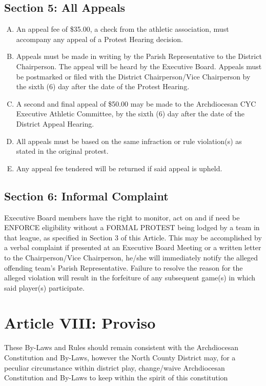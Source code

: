 \documentclass[letteraper,10pt,oneside,draft]{memoir}
\begin{document}
\subsection{Section 5: All Appeals}
\begin{enumerate}[A.]
    \item An appeal fee of \$35.00, a check from the athletic association, must accompany any appeal of a Protest Hearing decision.
    \item Appeals must be made in writing by the Parish Representative to the District Chairperson.  The appeal will be  heard by the Executive Board.  Appeals must be postmarked or filed with the District Chairperson/Vice Chairperson by the sixth (6) day after the date of the Protest Hearing.
    \item A second and final appeal of \$50.00 may be made to the Archdiocesan CYC Executive Athletic Committee, by the sixth (6) day after the date of the District Appeal Hearing.
    \item All appeals must be based on the same infraction or rule violation(s) as stated in the original protest.
    \item Any appeal fee tendered will be returned if said appeal is upheld.
\end{enumerate}

\subsection{Section 6: Informal Complaint}
Executive Board members have the right to monitor, act on and if need be ENFORCE eligibility without a FORMAL PROTEST being lodged by a team in that league, as specified in Section 3 of this Article.  This may be accomplished by a verbal complaint if presented at an Executive Board Meeting or a written letter to the Chairperson/Vice Chairperson, he/she will immediately notify the alleged offending team's Parish Representative.  Failure to resolve the reason for the alleged violation will result in the forfeiture of any subsequent game(s) in which said player(s) participate.

\section{Article VIII: Proviso}
These By-Laws and Rules should remain consistent with the Archdiocesan Constitution and By-Laws, however the North County District may, for a peculiar circumstance within district play, change/waive Archdiocesan Constitution and By-Laws to keep within the spirit of this constitution
\end{document}
